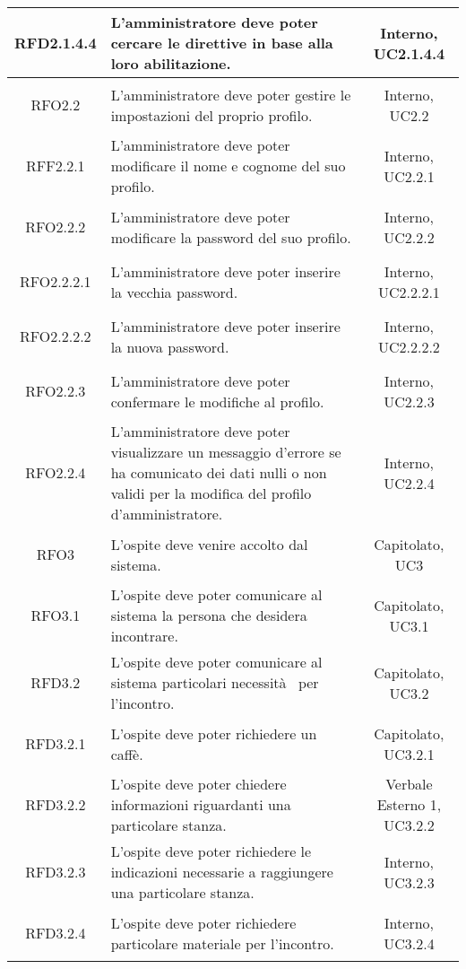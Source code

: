 \begin{longtable}{|c|>{\centering}m{7cm}|c|}
\hypertarget{RFD2.1.4.4}{RFD2.1.4.4} & L'amministratore deve poter cercare le direttive in base alla loro abilitazione. & Interno, UC2.1.4.4\\ \hline
\hypertarget{RFO2.2}{RFO2.2} & L'amministratore deve poter gestire le impostazioni del proprio profilo. & Interno, UC2.2\\ \hline
\hypertarget{RFF2.2.1}{RFF2.2.1} & L'amministratore deve poter modificare il nome e cognome del suo profilo. & Interno, UC2.2.1\\ \hline
\hypertarget{RFO2.2.2}{RFO2.2.2} & L'amministratore deve poter modificare la password del suo profilo. & Interno, UC2.2.2\\ \hline
\hypertarget{RFO2.2.2.1}{RFO2.2.2.1} & L'amministratore deve poter inserire la vecchia password. & Interno, UC2.2.2.1\\ \hline
\hypertarget{RFO2.2.2.2}{RFO2.2.2.2} & L'amministratore deve poter inserire la nuova password. & Interno, UC2.2.2.2\\ \hline
\hypertarget{RFO2.2.3}{RFO2.2.3} & L'amministratore deve poter confermare le modifiche al profilo. & Interno, UC2.2.3\\ \hline
\hypertarget{RFO2.2.4}{RFO2.2.4} & L'amministratore deve poter visualizzare un messaggio d'errore se ha comunicato dei dati nulli o non validi per la modifica del profilo d'amministratore. & Interno, UC2.2.4\\ \hline
\hypertarget{RFO3}{RFO3} & L'ospite deve venire accolto dal sistema. & Capitolato, UC3\\ \hline
\hypertarget{RFO3.1}{RFO3.1} & L'ospite deve poter comunicare al sistema la persona che desidera incontrare. & Capitolato, UC3.1\\ \hline
\hypertarget{RFD3.2}{RFD3.2} & L'ospite deve poter comunicare al sistema particolari necessità  per l'incontro. & Capitolato, UC3.2\\ \hline
\hypertarget{RFD3.2.1}{RFD3.2.1} & L'ospite deve poter richiedere un caffè. & Capitolato, UC3.2.1\\ \hline
\hypertarget{RFD3.2.2}{RFD3.2.2} & L'ospite deve poter chiedere informazioni riguardanti una particolare stanza. & Verbale Esterno 1, UC3.2.2\\ \hline
\hypertarget{RFD3.2.3}{RFD3.2.3} & L'ospite deve poter richiedere le indicazioni necessarie a raggiungere una particolare stanza. & Interno, UC3.2.3\\ \hline
\hypertarget{RFD3.2.4}{RFD3.2.4} & L'ospite deve poter richiedere particolare materiale per l'incontro. & Interno, UC3.2.4\\ \hline

\end{longtable}
